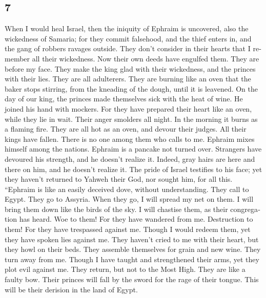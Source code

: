\begin{paracol}{2}
\switchcolumn
\begin{otherlanguage}{english}

\hypertarget{section-13}{%
\section{7}\label{section-13}}

 When I would heal Israel, then the iniquity of Ephraim is
uncovered, also the wickedness of Samaria; for they commit falsehood,
and the thief enters in, and the gang of robbers ravages outside.
 They don't consider in their hearts that I remember all
their wickedness. Now their own deeds have engulfed them. They are
before my face.  They make the king glad with their
wickedness, and the princes with their lies.  They are all
adulterers. They are burning like an oven that the baker stops stirring,
from the kneading of the dough, until it is leavened.  On
the day of our king, the princes made themselves sick with the heat of
wine. He joined his hand with mockers.  For they have
prepared their heart like an oven, while they lie in wait. Their anger
smolders all night. In the morning it burns as a flaming fire.
 They are all hot as an oven, and devour their judges. All
their kings have fallen. There is no one among them who calls to me.
 Ephraim mixes himself among the nations. Ephraim is a
pancake not turned over.  Strangers have devoured his
strength, and he doesn't realize it. Indeed, gray hairs are here and
there on him, and he doesn't realize it.  The pride of
Israel testifies to his face; yet they haven't returned to Yahweh their
God, nor sought him, for all this.  ``Ephraim is like an
easily deceived dove, without understanding. They call to Egypt. They go
to Assyria.  When they go, I will spread my net on them.
I will bring them down like the birds of the sky. I will chastise them,
as their congregation has heard.  Woe to them! For they
have wandered from me. Destruction to them! For they have trespassed
against me. Though I would redeem them, yet they have spoken lies
against me.  They haven't cried to me with their heart,
but they howl on their beds. They assemble themselves for grain and new
wine. They turn away from me.  Though I have taught and
strengthened their arms, yet they plot evil against me. 
They return, but not to the Most High. They are like a faulty bow. Their
princes will fall by the sword for the rage of their tongue. This will
be their derision in the land of Egypt.


\end{otherlanguage}
\end{paracol}
